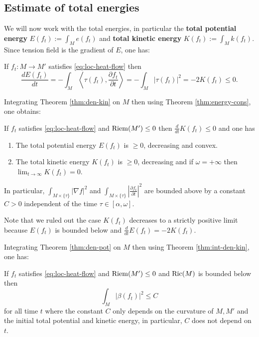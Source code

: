 \subsection{Estimate of total energies}
\label{sec:orgf49710e}

We will now work with the total energies, in particular the \textbf{total potential energy} \(E(f_t) := \int_M e(f_t)\) and \textbf{total kinetic energy} \(K(f_t) := \int_M k(f_t)\). Since
tension field is the gradient of \(E\), one has:

\begin{theorem}
\label{thm:energy-cons}
If \(f_t: M \longrightarrow  M'\) satisfies \eqref{eq:loc-heat-flow} then
\[
 \frac{d E(f_t)}{dt} = -\int_M \left\langle \tau(f_t), \frac{\partial f_t}{\partial t}
\right \rangle = -\int_M |\tau(f_t)|^2 = -2K(f_t) \leq 0.
\]
\end{theorem}

Integrating Theorem \ref{thm:den-kin} on \(M\) then using Theorem \ref{thm:energy-cons}, one obtains:

\begin{theorem}
\label{thm:int-den-kin}
If \(f_t\) satisfies \eqref{eq:loc-heat-flow} and \(\mathop{\rm Riem}\nolimits(M')\leq 0\) then \(\frac{d
}{dt}K(f_t) \leq 0\) and one has
\begin{enumerate}
\item The total potential energy \(E(f_t)\) is \(\geq 0\), decreasing and convex.
\item The total kinetic energy \(K(f_t)\) is \(\geq 0\), decreasing and if \(\omega =
   +\infty\) then \(\lim_{t\to\infty} K(f_t) = 0\).
\end{enumerate}
In particular, \(\int_{M\times \{\tau\}} |\nabla f|^2\) and \(\int_{M\times\{\tau\}} \left|
\frac{\partial f_t}{\partial t} \right|^2\) are bounded above by a constant \(C>0\)
independent of the time \(\tau \in[\alpha,\omega]\).
\end{theorem}
Note that we ruled out the case \(K(f_t)\) decreases to a strictly positive limit
because \(E(f_t)\) is bounded below and \(\frac{d }{d t} E(f_t) = -2K(f_t)\).


Integrating Theorem \ref{thm:den-pot} on \(M\) then using Theorem \ref{thm:int-den-kin}, one has:

\begin{theorem}
\label{thm:int-den-pot}
If \(f_t\) satisfies \eqref{eq:loc-heat-flow} and \(\mathop{\rm Riem}\nolimits(M')\leq 0\) and \(\mathop{\rm Ric}\nolimits(M)\)
is bounded below then 
\[
\int_M |\beta(f_t)|^2 \leq C
\]
for all time \(t\) where the constant \(C\) only depends on the curvature of \(M, M'\) and the initial total potential and kinetic energy, in particular, \(C\) does not depend on \(t\).
\end{theorem}

